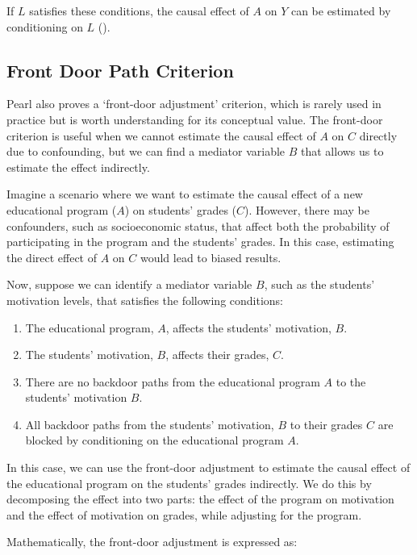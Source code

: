 \documentclass[
  single column]{article}
\providecommand{\tightlist}{%
  \setlength{\itemsep}{0pt}\setlength{\parskip}{0pt}}\usepackage{longtable,booktabs,array}
\begin{document}
If \(L\) satisfies these conditions, the causal effect of \(A\) on \(Y\)
can be estimated by conditioning on \(\boxed{L}\)
().

\subsection{Front Door Path Criterion}\label{front-door-path-criterion}

Pearl also proves a `front-door adjustment' criterion, which is rarely
used in practice but is worth understanding for its conceptual value.
The front-door criterion is useful when we cannot estimate the causal
effect of \(A\) on \(C\) directly due to confounding, but we can find a
mediator variable \(B\) that allows us to estimate the effect
indirectly.

Imagine a scenario where we want to estimate the causal effect of a new
educational program (\(A\)) on students' grades (\(C\)). However, there
may be confounders, such as socioeconomic status, that affect both the
probability of participating in the program and the students' grades. In
this case, estimating the direct effect of \(A\) on \(C\) would lead to
biased results.

Now, suppose we can identify a mediator variable \(B\), such as the
students' motivation levels, that satisfies the following conditions:

\begin{enumerate}
\def\labelenumi{\arabic{enumi}.}
\tightlist
\item
  The educational program, \(A\), affects the students' motivation,
  \(B\).
\item
  The students' motivation, \(B\), affects their grades, \(C\).
\item
  There are no backdoor paths from the educational program \(A\) to the
  students' motivation \(B\).
\item
  All backdoor paths from the students' motivation, \(B\) to their
  grades \(C\) are blocked by conditioning on the educational program
  \(A\).
\end{enumerate}

In this case, we can use the front-door adjustment to estimate the
causal effect of the educational program on the students' grades
indirectly. We do this by decomposing the effect into two parts: the
effect of the program on motivation and the effect of motivation on
grades, while adjusting for the program.

Mathematically, the front-door adjustment is expressed as:
\end{document}
